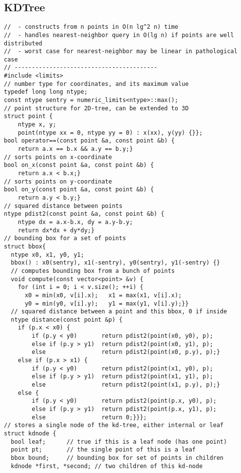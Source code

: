 \documentclass[8pt, oneside]{extarticle}
\begin{document}
\begin{multicols}{3}
\subsection{KDTree}
\begin{lstlisting}
//  - constructs from n points in O(n lg^2 n) time
//  - handles nearest-neighbor query in O(lg n) if points are well distributed
//  - worst case for nearest-neighbor may be linear in pathological case
// -----------------------------------------
#include <limits>
// number type for coordinates, and its maximum value
typedef long long ntype;
const ntype sentry = numeric_limits<ntype>::max();
// point structure for 2D-tree, can be extended to 3D
struct point {
    ntype x, y;
    point(ntype xx = 0, ntype yy = 0) : x(xx), y(yy) {}};
bool operator==(const point &a, const point &b) {
    return a.x == b.x && a.y == b.y;}
// sorts points on x-coordinate
bool on_x(const point &a, const point &b) {
    return a.x < b.x;}
// sorts points on y-coordinate
bool on_y(const point &a, const point &b) {
    return a.y < b.y;}
// squared distance between points
ntype pdist2(const point &a, const point &b) {
    ntype dx = a.x-b.x, dy = a.y-b.y;
    return dx*dx + dy*dy;}
// bounding box for a set of points
struct bbox{
  ntype x0, x1, y0, y1;
  bbox() : x0(sentry), x1(-sentry), y0(sentry), y1(-sentry) {}
  // computes bounding box from a bunch of points
  void compute(const vector<point> &v) {
    for (int i = 0; i < v.size(); ++i) {
      x0 = min(x0, v[i].x);   x1 = max(x1, v[i].x);
      y0 = min(y0, v[i].y);   y1 = max(y1, v[i].y);}}
  // squared distance between a point and this bbox, 0 if inside
  ntype distance(const point &p) {
    if (p.x < x0) {
        if (p.y < y0)       return pdist2(point(x0, y0), p);
        else if (p.y > y1)  return pdist2(point(x0, y1), p);
        else                return pdist2(point(x0, p.y), p);}
    else if (p.x > x1) {
        if (p.y < y0)       return pdist2(point(x1, y0), p);
        else if (p.y > y1)  return pdist2(point(x1, y1), p);
        else                return pdist2(point(x1, p.y), p);}
    else {
        if (p.y < y0)       return pdist2(point(p.x, y0), p);
        else if (p.y > y1)  return pdist2(point(p.x, y1), p);
        else                return 0;}}};
// stores a single node of the kd-tree, either internal or leaf
struct kdnode {
  bool leaf;      // true if this is a leaf node (has one point)
  point pt;       // the single point of this is a leaf
  bbox bound;     // bounding box for set of points in children
  kdnode *first, *second; // two children of this kd-node

\end{lstlisting}
\end{multicols}
\end{document}
